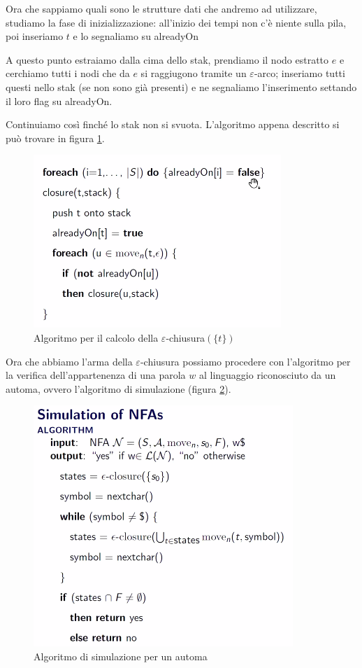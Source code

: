 \documentclass[class=book, crop=false, oneside, 12pt]{standalone}
\begin{document}
Ora che sappiamo quali sono le strutture dati che andremo ad utilizzare, studiamo la fase di inizializzazione: all’inizio dei tempi non c’è niente sulla pila, poi inseriamo \(t\) e lo segnaliamo su alreadyOn

A questo punto estraiamo dalla cima dello stak, prendiamo il nodo estratto \(e\) e cerchiamo tutti i nodi che da \(e\) si raggiugono tramite un \(\varepsilon\)-arco; inseriamo tutti questi nello stak (se non sono già presenti) e ne segnaliamo l'inserimento settando il loro flag su alreadyOn.

Continuiamo così finché lo stak non si svuota. L'algoritmo appena descritto si può trovare in figura \ref{algoritmo_epsilon_chiusura}.

\begin{figure}[H]
    \centering
    \includegraphics[width=.6\textwidth,keepaspectratio]{algoritmo_epsilon_chiusura}
    \caption{Algoritmo per il calcolo della \(\varepsilon\)-chiusura\((\{t\})\)}
    \label{algoritmo_epsilon_chiusura}
\end{figure}


Ora che abbiamo l'arma della \(\varepsilon\)-chiusura possiamo procedere con l'algoritmo per la verifica dell'appartenenza di una parola \(w\) al linguaggio riconosciuto da un automa, ovvero l'algoritmo di simulazione (figura \ref{algoritmo_simulazione_nfa}).

\begin{figure}
    \centering
    \includegraphics[width=.6\textwidth,keepaspectratio]{algoritmo_simulazione_nfa}
    \caption{Algoritmo di simulazione per un automa}
    \label{algoritmo_simulazione_nfa}
\end{figure}
\end{document}
